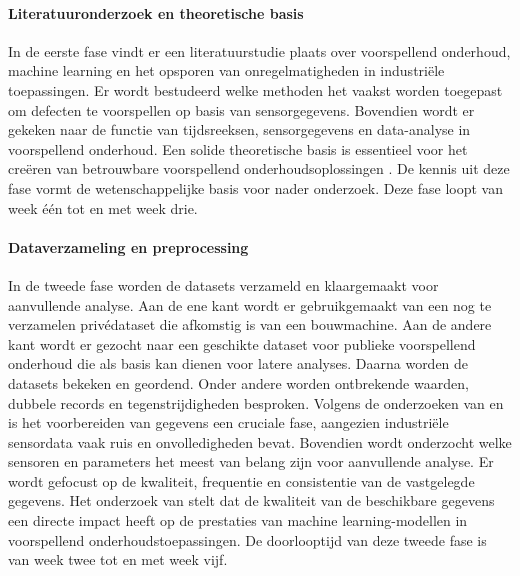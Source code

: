 \paragraph{Literatuuronderzoek en theoretische basis}

In de eerste fase vindt er een literatuurstudie plaats over voorspellend onderhoud, machine learning en het opsporen van onregelmatigheden in industriële toepassingen. Er wordt bestudeerd welke methoden het vaakst worden toegepast om defecten te voorspellen op basis van sensorgegevens. Bovendien wordt er gekeken naar de functie van tijdsreeksen, sensorgegevens en data-ana\-lyse in voorspellend onderhoud. Een solide theoretische basis is essentieel voor het creëren van betrouwbare voorspellend onderhoudsoplossingen \autocite{Carvalho2019, Elahi2023}. De kennis uit deze fase vormt de wetenschappelijke basis voor nader onderzoek. Deze fase loopt van week één tot en met week drie.


\paragraph{Dataverzameling en preprocessing}

In de twe\-ede fase worden de datasets verzameld en klaargemaakt voor aanvullende analyse. Aan de ene kant wordt er gebruikgemaakt van een nog te verzamelen privédataset die afkomstig is van een bouwmachine. Aan de andere kant wordt er gezocht naar een geschikte dataset voor publieke voorspellend onderhoud die als basis kan dienen voor latere analyses. Daarna worden de datasets bekeken en geordend. Onder andere worden ontbrekende waarden, dubbele records en tegenstrijdigheden besproken. Volgens de onderzoeken van \textcite{Dissem2024} en \textcite{Carvalho2019} is het voorbereiden van gegevens een cruciale fase, aangezien industriële sensordata vaak ruis en onvolledigheden bevat. Bovendien wordt onderzocht welke sensoren en parameters het meest van belang zijn voor aanvullende analyse. Er wordt gefocust op de kwaliteit, frequentie en consistentie van de vastgelegde gegevens. Het onderzoek van \textcite{Elahi2023} stelt dat de kwaliteit van de beschikbare gegevens een directe impact heeft op de prestaties van machine learning-modellen in voorspellend onderhoudstoepassingen. De doorlooptijd van deze tweede fase is van week twee tot en met week vijf. 

